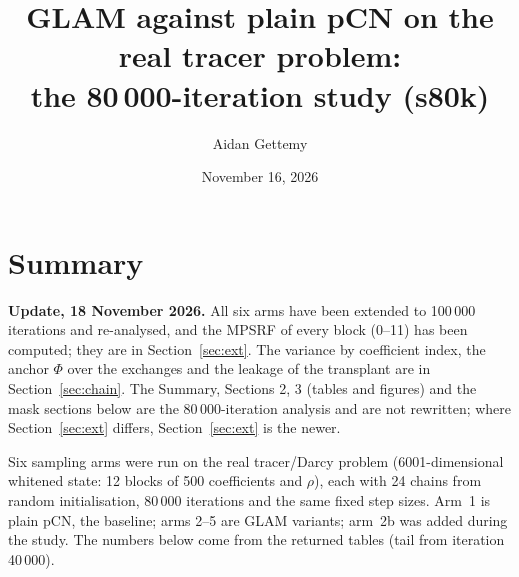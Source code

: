 \documentclass[11pt]{article}
\title{GLAM against plain pCN on the real tracer problem:\\ the 80\,000-iteration study (s80k)}
\author{Aidan Gettemy}
\date{November 16, 2026}
\begin{document}
\maketitle

\section{Summary}
\textbf{Update, 18 November 2026.} All six arms have been extended to 100\,000 iterations and re-analysed, and the MPSRF of every block (0--11) has been computed; they are in Section~\ref{sec:ext}. The variance by coefficient index, the anchor $\Phi$ over the exchanges and the leakage of the transplant are in Section~\ref{sec:chain}. The Summary, Sections 2, 3 (tables and figures) and the mask sections below are the 80\,000-iteration analysis and are not rewritten; where Section~\ref{sec:ext} differs, Section~\ref{sec:ext} is the newer.

Six sampling arms were run on the real tracer/Darcy problem (6001-dimensional whitened state: 12 blocks of 500 coefficients and $\rho$), each with 24 chains from random initialisation, 80\,000 iterations and the same fixed step sizes. Arm~1 is plain pCN, the baseline; arms 2--5 are GLAM variants; arm~2b was added during the study. The numbers below come from the returned tables (tail from iteration 40\,000).
\end{document}
